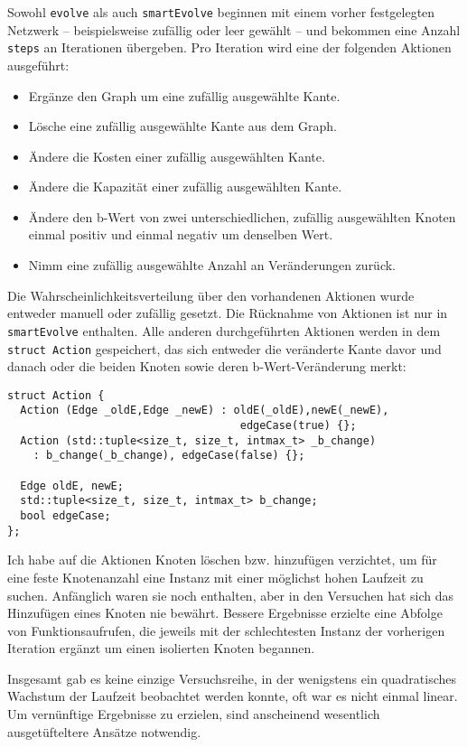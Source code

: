 Sowohl \lstinline|evolve| als auch \lstinline|smartEvolve| beginnen mit einem vorher festgelegten Netzwerk -- beispielsweise zufällig oder leer gewählt -- und bekommen eine Anzahl \lstinline|steps| an Iterationen übergeben. Pro Iteration wird eine der folgenden Aktionen ausgeführt:
\begin{itemize}\itemsep0em
    \item Ergänze den Graph um eine zufällig ausgewählte Kante.
    \item Lösche eine zufällig ausgewählte Kante aus dem Graph.
    \item Ändere die Kosten einer zufällig ausgewählten Kante.
    \item Ändere die Kapazität einer zufällig ausgewählten Kante.
    \item Ändere den b-Wert von zwei unterschiedlichen, zufällig ausgewählten Knoten einmal positiv und einmal negativ um denselben Wert.
    \item Nimm eine zufällig ausgewählte Anzahl an Veränderungen zurück.
\end{itemize}

Die Wahrscheinlichkeitsverteilung über den vorhandenen Aktionen wurde entweder manuell oder zufällig gesetzt. Die Rücknahme von Aktionen ist nur in \lstinline|smartEvolve| enthalten. Alle anderen durchgeführten Aktionen werden in dem \lstinline|struct Action| gespeichert, das sich entweder die veränderte Kante davor und danach oder die beiden Knoten sowie deren b-Wert-Veränderung merkt:

\begin{lstlisting}
struct Action {
  Action (Edge _oldE,Edge _newE) : oldE(_oldE),newE(_newE),
                                    edgeCase(true) {};
  Action (std::tuple<size_t, size_t, intmax_t> _b_change)
    : b_change(_b_change), edgeCase(false) {};

  Edge oldE, newE;
  std::tuple<size_t, size_t, intmax_t> b_change;
  bool edgeCase;
};
\end{lstlisting}

Ich habe auf die Aktionen Knoten löschen bzw. hinzufügen verzichtet, um für eine feste Knotenanzahl eine Instanz mit einer möglichst hohen Laufzeit zu suchen. Anfänglich waren sie noch enthalten, aber in den Versuchen hat sich das Hinzufügen eines Knoten nie bewährt. Bessere Ergebnisse erzielte eine Abfolge von Funktionsaufrufen, die jeweils mit der schlechtesten Instanz der vorherigen Iteration ergänzt um einen isolierten Knoten begannen.

Insgesamt gab es keine einzige Versuchsreihe, in der wenigstens ein quadratisches Wachstum der Laufzeit beobachtet werden konnte, oft war es nicht einmal linear. Um vernünftige Ergebnisse zu erzielen, sind anscheinend wesentlich ausgetüfteltere Ansätze notwendig.